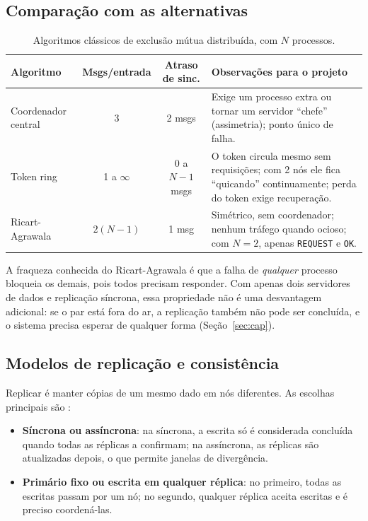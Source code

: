 \documentclass[11pt,a4paper]{article}
\newcommand{\msg}[1]{\texttt{#1}}
\begin{document}
\subsection{Comparação com as alternativas}

\begin{table}[H]
\centering
\caption{Algoritmos clássicos de exclusão mútua distribuída, com $N$ processos.}
\label{tab:comparacao}
\begin{tabularx}{\textwidth}{@{}lccX@{}}
\toprule
\textbf{Algoritmo} & \textbf{Msgs/entrada} & \textbf{Atraso de sinc.} & \textbf{Observações para o projeto} \\
\midrule
Coordenador central & 3 & 2 msgs &
  Exige um processo extra ou tornar um servidor ``chefe'' (assimetria); ponto
  único de falha. \\
Token ring & 1 a $\infty$ & 0 a $N-1$ msgs &
  O token circula mesmo sem requisições; com 2 nós ele fica ``quicando''
  continuamente; perda do token exige recuperação. \\
\rowcolor{destaque!8}
Ricart-Agrawala & $2(N-1)$ & 1 msg &
  Simétrico, sem coordenador; nenhum tráfego quando ocioso; com $N=2$, apenas
  \msg{REQUEST} e \msg{OK}. \\
\bottomrule
\end{tabularx}
\end{table}

A fraqueza conhecida do Ricart-Agrawala é que a falha de \emph{qualquer} processo
bloqueia os demais, pois todos precisam responder. Com apenas dois servidores de
dados e replicação síncrona, essa propriedade não é uma desvantagem adicional:
se o par está fora do ar, a replicação também não pode ser concluída, e o sistema
precisa esperar de qualquer forma (Seção~\ref{sec:cap}).

\subsection{Modelos de replicação e consistência}

Replicar é manter cópias de um mesmo dado em nós diferentes. As escolhas principais
são \cite{tanenbaum}:

\begin{itemize}
  \item \textbf{Síncrona ou assíncrona}: na síncrona, a escrita só é considerada
        concluída quando todas as réplicas a confirmam; na assíncrona, as réplicas
        são atualizadas depois, o que permite janelas de divergência.
  \item \textbf{Primário fixo ou escrita em qualquer réplica}: no primeiro, todas as
        escritas passam por um nó; no segundo, qualquer réplica aceita escritas e é
        preciso coordená-las.
\end{itemize}
\end{document}
